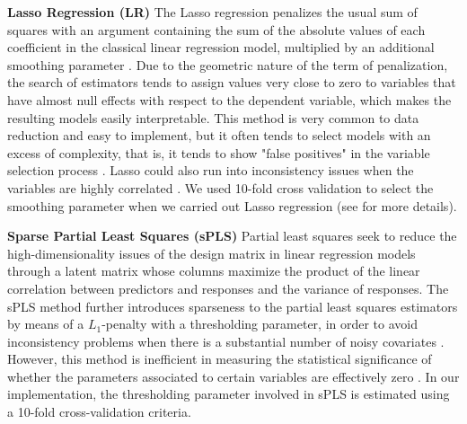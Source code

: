 \documentclass[12pt]{amsart}
\theoremstyle{plain}
\theoremstyle{definition}
\theoremstyle{remark}
\begin{document}
{\bf Lasso Regression (LR)}
  The Lasso regression penalizes the usual sum of squares with an argument
 containing the sum of the absolute values of each coefficient in the classical
 linear regression model, multiplied by an additional smoothing parameter \citep{Tibshirani1996}. Due
 to the geometric nature of the term of penalization, the search of estimators
 tends to assign values very close to zero to variables that have almost null
 effects with respect to the dependent variable, which makes the resulting
 models easily interpretable. This method is very common to data reduction and easy to implement, but it often tends to select models with an excess of complexity, that is,
 it tends to show "false positives" in the variable selection process 
 \citep{Fan2010}. Lasso could also run into inconsistency issues when the
 variables are highly correlated \citep{Zou2005}.
 We used 10-fold cross validation to select the smoothing parameter when we carried out Lasso regression (see \cite{Tibshirani1996} for more details). 
 
{\bf Sparse Partial Least Squares (sPLS)}
  Partial least squares seek to reduce the high-dimensionality issues of the
  design matrix in  
  linear regression models through a latent matrix whose columns maximize
  the product of the linear correlation between predictors and responses and the
  variance of responses. The sPLS method further introduces sparseness to the partial least squares
  estimators by means of a $L_1$-penalty with a thresholding parameter, in order to avoid inconsistency problems when there is a
  substantial number of noisy covariates \citep{Chun2010,Chung2013}. However, this method is inefficient in
  measuring the statistical significance of whether the parameters associated to certain
  variables are effectively zero \citep{OlsonHunt2014}. In our implementation, the
  thresholding parameter involved in sPLS is estimated using a 10-fold cross-validation criteria.    
\end{document}
